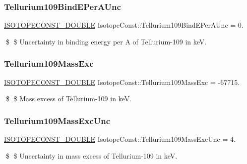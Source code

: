 \subsubsection{\texorpdfstring{Tellurium109\+Bind\+E\+Per\+A\+Unc}{Tellurium109BindEPerAUnc}}
{\footnotesize\ttfamily \mbox{\hyperlink{group___isotope_const-_macros_ga8f45a7272ce02c0b4c65c44636ed719a}{I\+S\+O\+T\+O\+P\+E\+C\+O\+N\+S\+T\+\_\+\+D\+O\+U\+B\+LE}} Isotope\+Const\+::\+Tellurium109\+Bind\+E\+Per\+A\+Unc = 0.}

\$ \$ Uncertainty in binding energy per A of Tellurium-\/109 in keV. \mbox{\label{group___isotope_const-_tellurium-_te109_gafda367abf9140687a5b210777caa93f6}} 
\subsubsection{\texorpdfstring{Tellurium109\+Mass\+Exc}{Tellurium109MassExc}}
{\footnotesize\ttfamily \mbox{\hyperlink{group___isotope_const-_macros_ga8f45a7272ce02c0b4c65c44636ed719a}{I\+S\+O\+T\+O\+P\+E\+C\+O\+N\+S\+T\+\_\+\+D\+O\+U\+B\+LE}} Isotope\+Const\+::\+Tellurium109\+Mass\+Exc = -\/67715.}

\$ \$ Mass excess of Tellurium-\/109 in keV. \mbox{\label{group___isotope_const-_tellurium-_te109_ga7b14a275356761ea2923ee481eec6de9}} 
\subsubsection{\texorpdfstring{Tellurium109\+Mass\+Exc\+Unc}{Tellurium109MassExcUnc}}
{\footnotesize\ttfamily \mbox{\hyperlink{group___isotope_const-_macros_ga8f45a7272ce02c0b4c65c44636ed719a}{I\+S\+O\+T\+O\+P\+E\+C\+O\+N\+S\+T\+\_\+\+D\+O\+U\+B\+LE}} Isotope\+Const\+::\+Tellurium109\+Mass\+Exc\+Unc = 4.}

\$ \$ Uncertainty in mass excess of Tellurium-\/109 in keV. \mbox{\label{group___isotope_const-_tellurium-_te109_ga9b322e7e509739b73964748279b74d53}} 
